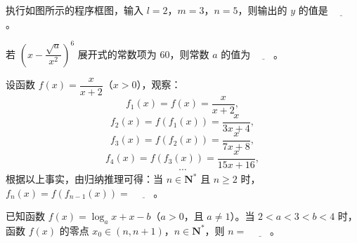 \Needspace{0.4\textheight}
\begin{question}
执行如图所示的程序框图，输入 $l=2$，$m=3$，$n=5$，则输出的 $y$ 的值是 $\underline{\qquad}$。
\nopagebreak[4]
\begin{center}\end{center}
\nopagebreak[4]
\end{question}
\begin{question}
若 $\left(x-\dfrac{\sqrt a}{x^2}\right)^6$ 展开式的常数项为 $60$，则常数 $a$ 的值为 $\underline{\qquad}$。

\end{question}
\begin{question}
设函数 $f(x)=\dfrac{x}{x+2}$（$x>0$），观察：
\nopagebreak[4]
\[f_1(x)=f(x)=\frac{x}{x+2},\]
\nopagebreak[4]
\[f_2(x)=f(f_1(x))=\frac{x}{3x+4},\]
\nopagebreak[4]
\[f_3(x)=f(f_2(x))=\frac{x}{7x+8},\]
\nopagebreak[4]
\[f_4(x)=f(f_3(x))=\frac{x}{15x+16},\]
\nopagebreak[4]
\[\cdots\]
根据以上事实，由归纳推理可得：当 $n\in\mathbf N^*$ 且 $n\geqslant2$ 时，$f_n(x)=f(f_{n-1}(x))=$ $\underline{\qquad}$。

\end{question}
\begin{question}
已知函数 $f(x)=\log_ax+x-b$（$a>0$，且 $a\neq1$）。当 $2<a<3<b<4$ 时，函数 $f(x)$ 的零点 $x_0\in(n,n+1)$，$n\in\mathbf N^*$，则 $n=$ $\underline{\qquad}$。

\end{question}


